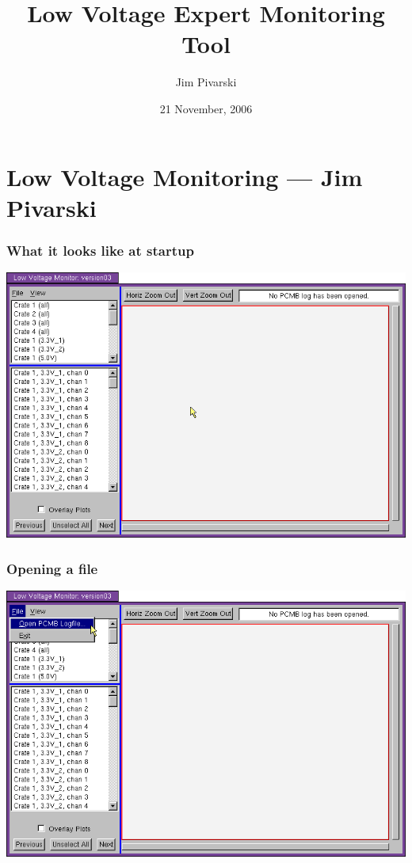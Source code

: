 \documentclass[12pt,compress]{beamer}
\title{Low Voltage Expert Monitoring Tool}
\author{Jim Pivarski}
\institute{Texas A\&M University}
\date{21 November, 2006}
\begin{document}
\frame{\titlepage}
\section*{Low Voltage Monitoring --- Jim Pivarski}

\begin{frame}
\frametitle{What it looks like at startup}
\begin{center}
\includegraphics[width=0.9\linewidth]{01.png}
\end{center}
\end{frame}

\begin{frame}
\frametitle{Opening a file}
\begin{center}
\includegraphics[width=0.9\linewidth]{02.png}
\end{center}
\end{frame}
\end{document}
